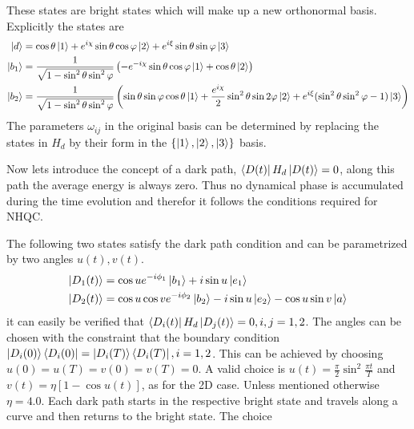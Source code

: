 These states are bright states which will make up a new orthonormal basis. 
Explicitly the states are 
\begin{equation}
\label{eq:states}
\begin{aligned}
\ket{d} &= \cos\theta\ket{1} + e^{i\chi}\sin\theta\cos\varphi\ket{2} + e^{i\xi}\sin\theta\sin\varphi\ket{3}
\\
\ket{b_1} &= \frac{1}{\sqrt{1-\sin^2\theta\sin^2\varphi}} \left(-e^{-i\chi}\sin\theta\cos\varphi\ket{1} + \cos\theta\ket{2} \right)
\\
\ket{b_2} &= \frac{1}{\sqrt{1-\sin^2\theta\sin^2\varphi}} \left(\sin\theta\sin\varphi\cos\theta\ket{1} + \dfrac{e^{i\chi}}{2}\sin^2\theta\sin 2\varphi\ket{2} + e^{i\xi}(\sin^2\theta\sin^2\varphi - 1)\ket{3}\right)
\end{aligned}
\end{equation}
The parameters $\omega_{ij}$ in the original basis can be determined by replacing the states in $H_d$ by their form in the $\{\ket{1},\ket{2},\ket{3}\}$ basis.

Now lets introduce the concept of a dark path, $\bra{D(t)}H_d\ket{D(t)} = 0$, along this path the average energy is always zero. Thus no dynamical phase is accumulated during the time evolution and therefor it follows the conditions required for NHQC.

The following two states satisfy the dark path condition and can be parametrized by two angles $u(t), v(t)$.
\begin{equation}
\label{eq:dpaths}
\begin{aligned}
\ket{D_1(t)} &= \cos u e^{-i\phi_1}\ket{b_1} + i\sin u \ket{e_1}
\\
\ket{D_2(t)} &= \cos u\cos v e^{-i\phi_2}\ket{b_2} - i\sin u \ket{e_2} - \cos u\sin v \ket{a}
\end{aligned}
\end{equation}
it can easily be verified that $\bra{D_i(t)}H_d\ket{D_j(t)} = 0, i,j = 1,2$. The angles can be chosen with the constraint that the boundary condition $\ket{D_i(0)}\bra{D_i(0)} = \ket{D_i(T)}\bra{D_i(T)}, i = 1,2$. This can be achieved by choosing $u(0) = u(T) = v(0) = v(T) = 0$. A valid choice is $u(t) = \frac{\pi}{2}\sin^2\frac{\pi t}{T}$ and $v(t) = \eta\left[1 - \cos u(t)\right]$, as for the 2D case. Unless mentioned otherwise $\eta = 4.0$. Each dark path starts in the respective bright state and travels along a curve and then returns to the bright state. The choice 

